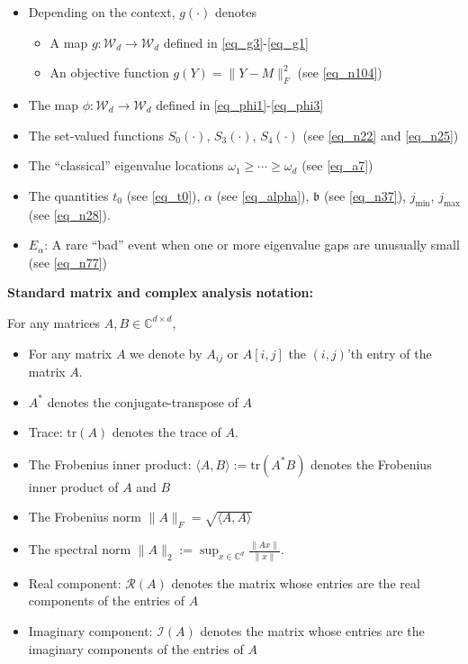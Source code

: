 \documentclass[11pt,letterpaper]{article}
\begin{document}
\begin{itemize}
\item Depending on the context, $g(\cdot)$ denotes
\begin{itemize}
\item A map $g : \mathcal{W}_d \rightarrow \mathcal{W}_d$ defined in \eqref{eq_g3}-\eqref{eq_g1} 
\item An objective function  $g(Y) = \|Y - M\|_F^2$ (see \eqref{eq_n104})
\end{itemize}

\item The map $\phi : \mathcal{W}_d \rightarrow \mathcal{W}_d$ defined in \eqref{eq_phi1}-\eqref{eq_phi3}

\item The set-valued functions $S_0(\cdot)$, $S_3(\cdot)$, $S_4(\cdot)$ (see \eqref{eq_n22} and \eqref{eq_n25})

  \item The ``classical'' eigenvalue locations $\omega_1 \geq \cdots \geq \omega_d$ (see \eqref{eq_a7})

\item The quantities $t_0$ (see \eqref{eq_t0}), $\alpha$ (see \eqref{eq_alpha}), $\mathfrak{b}$ (see \eqref{eq_n37}), $j_{\mathrm{min}}$, $j_{\mathrm{max}}$ (see \eqref{eq_n28}).

\item $E_\alpha$: A rare ``bad'' event when one or more eigenvalue gaps are unusually small (see \eqref{eq_n77})

   \end{itemize}

{\bf Standard matrix and complex analysis notation:}

For any matrices $A, B \in \mathbb{C}^{d \times d}$,
\begin{itemize}
%
\item For any matrix $A$ we denote by $A_{ij}$ or $A[i,j]$ the $(i,j)$'th entry of the matrix $A$.
%
\item $A^\ast$ denotes the conjugate-transpose of $A$
%
\item  Trace: $\mathrm{tr}(A)$ denotes the trace of $A$.
%
\item The Frobenius inner product: $\langle A , B \rangle := \mathrm{tr}(A^\ast B)$ denotes the Frobenius inner product of $A$ and $B$
%
\item The Frobenius norm $\|A\|_F = \sqrt{\langle A , A \rangle}$
%
\item The spectral norm $\| A \|_2 := \sup_{x \in \mathbb{C}^d} \frac{\|A x\|}{\|x\|}$.
%
\item Real component: $\mathcal{R}(A)$ denotes the matrix whose entries are the real components of the entries of $A$
%
\item Imaginary component: $\mathcal{I}(A)$ denotes the matrix whose entries are the imaginary components of the entries of $A$
\end{itemize}
\end{document}
